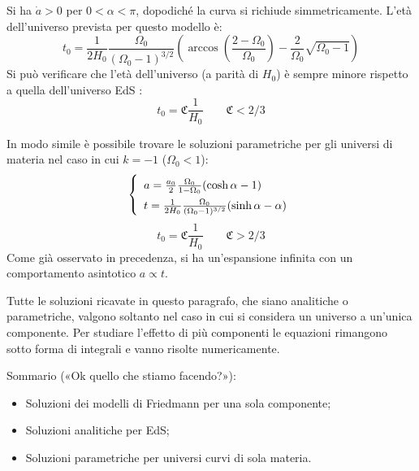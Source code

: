 Si ha $\dot{a}>0$ per $0<\alpha < \pi$, dopodiché la curva si richiude simmetricamente. L'età dell'universo prevista per questo modello è:
\begin{equation*}
    t_0 = \frac{1}{2H_0}\frac{\Omega_0}{(\Omega_0 -1)^{3/2}}\left ( \arccos{\left ( \frac{2-\Omega_0}{\Omega_0} \right )}  -\frac{2}{\Omega_0}\sqrt{\Omega_0-1} \right )
\end{equation*}
Si può verificare che l'età dell'universo (a parità di $H_0$) è sempre minore rispetto a quella dell'universo EdS :
\begin{equation}
t_0 = \mathfrak{C} \frac{1}{H_0}\qquad \mathfrak{C}< 2/3
\end{equation}

In modo simile è possibile trovare le soluzioni parametriche per gli universi di materia nel caso in cui $k=-1$ ($\Omega_0<1$): 
\begin{equation}\left\{
\def\arraystretch{1.5}
    \begin{array}{ll}
    a=\frac{a_0}{2} \frac{\Omega_0}{1-\Omega_0}    (\cosh \alpha -1) \\
    t=\frac{1}{2H_0} \frac{\Omega_0}{(\Omega_0 -1)^{3/2}}  (\sinh \alpha -\alpha)
\end{array}\right.
\end{equation}
\begin{equation}
t_0 = \mathfrak{C} \frac{1}{H_0}\qquad \mathfrak{C}> 2/3
\end{equation}
Come già osservato in precedenza, si ha un'espansione infinita con un comportamento asintotico $a\propto t $.

Tutte le soluzioni ricavate in questo paragrafo, che siano analitiche o parametriche, valgono soltanto nel caso in cui si considera un universo a un'unica componente. Per studiare l'effetto di più componenti le equazioni rimangono sotto forma di integrali e vanno risolte numericamente.

Sommario («Ok quello che stiamo facendo?»):
\begin{itemize}
    \item Soluzioni dei modelli di Friedmann per una sola componente;
    \item Soluzioni analitiche per EdS;
    \item Soluzioni parametriche per universi curvi di sola materia.
\end{itemize}

